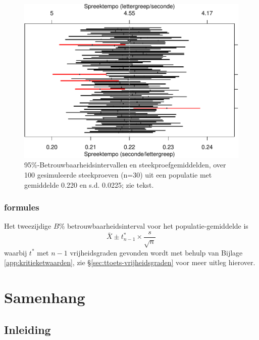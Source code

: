 \documentclass[
]{book}
\begin{document}
\begin{figure}
\centering
\includegraphics{KMS-NL_files/figure-latex/tempo95CIs-1.pdf}
\caption{\label{fig:tempo95CIs}95\%-Betrouwbaarheidsintervallen en steekproefgemiddelden, over 100 gesimuleerde steekproeven (n=30) uit een populatie met gemiddelde 0.220 en s.d. 0.0225; zie tekst.}
\end{figure}

\hypertarget{formules-2}{%
\subsection{formules}\label{formules-2}}

Het tweezijdige \(B\)\% betrouwbaarheidsinterval voor het
populatie-gemiddelde is
\begin{equation}
  \bar{X} \pm t^*_{n-1} \times \frac{s}{\sqrt{n}}
  \label{eq:t-onesampleCI}
\end{equation}
waarbij \(t^*\) met \(n-1\) vrijheidsgraden gevonden wordt met behulp van
Bijlage \ref{app:kritieketwaarden}, zie
§\ref{sec:ttoets-vrijheidsgraden} voor meer uitleg hierover.

\hypertarget{ch:samenhang}{%
\chapter{Samenhang}\label{ch:samenhang}}

\hypertarget{inleiding-5}{%
\section{Inleiding}\label{inleiding-5}}
\end{document}
